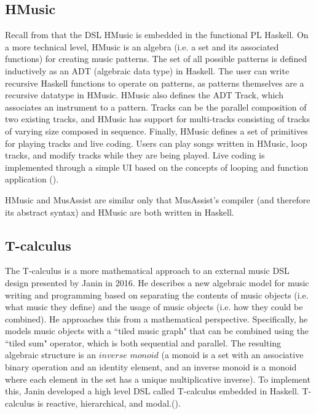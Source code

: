 \documentclass{report}
\newcommand\citeparen[1]{(\cite{#1})}
\begin{document}
\subsection{HMusic}
Recall from  that the DSL HMusic is embedded in the functional PL Haskell. On a  more  technical level, HMusic is an algebra (i.e. a set and its associated functions) for creating music  patterns. The set of  all possible patterns is defined  inductively as an ADT (algebraic data  type) in Haskell. The user can write recursive  Haskell functions to operate on patterns, as patterns  themselves are a recursive datatype in HMusic. HMusic also defines the ADT Track, which associates an instrument to a pattern. Tracks can be  the parallel composition of two existing  tracks, and HMusic has support for multi-tracks consisting of tracks of varying size composed in sequence. Finally, HMusic defines a set of primitives for playing  tracks and live coding. Users can play songs  written in HMusic, loop tracks, and  modify tracks while they are being  played. Live coding is implemented through a simple  UI  based  on the concepts of looping and  function application \citeparen{bois_ribeiro_1970}.

HMusic and MusAssist are similar only that MusAssist's compiler (and therefore its abstract syntax) and HMusic are both written in Haskell.  

\subsection{T-calculus}
The T-calculus is a more mathematical  approach to an external music DSL design presented by Janin in 2016. He describes  a  new  algebraic model for music  writing and  programming based on separating  the contents of music objects (i.e.  what  music  they define)  and the usage of music  objects  (i.e.  how  they could be  combined). He approaches this from a mathematical perspective. Specifically, he  models music objects with a ``tiled music graph" that can be combined using the  ``tiled  sum"  operator, which is both sequential and parallel. The  resulting algebraic structure is  an $inverse$ $monoid$  (a monoid is  a set with an associative binary operation and  an identity element, and an inverse monoid is a monoid where each element  in the set has a unique multiplicative inverse). To  implement this, Janin developed a high  level DSL called T-calculus embedded  in Haskell. T-calculus  is  reactive, hierarchical, and modal.\citeparen{janin}.
\end{document}
